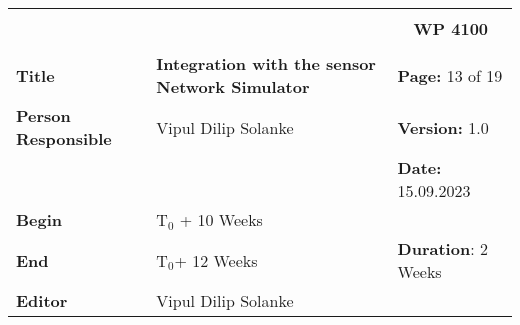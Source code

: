 \begin{table}[!h]
  \begin{center}
    \begin{tabular}{|p{35mm}||p{55mm}|p{50mm}||p{40mm}|}
      \hline
      \multicolumn{3}{|l||}{\textbf{}} & \multicolumn{1}{c|}{}                                                                                                                                                \\
      \multicolumn{3}{|l||}{\textbf{}} & \multicolumn{1}{c|}{\textbf{WP 4100}}                                                                                                                                \\
      \multicolumn{3}{|l||}{\textbf{}} & \multicolumn{1}{c|}{}                                                                                                                                                \\
      \hline\hline
      \textbf{Title}                   & \multicolumn{2}{p{7cm}||}{\textbf{Integration with the sensor Network Simulator}}
                                       & \textbf{Page:} 13 of 19                                                                                                                                             \\
      \hline
      \textbf{Person Responsible}        & \multicolumn{2}{l||}{Vipul Dilip Solanke}                                                                                                   & \textbf{Version:} 1.0   \\
      \hline
      \multicolumn{3}{|l||}{}          & \textbf{Date:} 15.09.2023                                                                                                                                          \\
      \hline\hline
      \textbf{Begin}                  & \multicolumn{2}{l||}{T$_0$ + 10 Weeks}                                                                                                                &                         \\
      \hline
      \textbf{End}                    & \multicolumn{2}{l||}{T$_0$+ 12 Weeks}                                                                                                        & \textbf{Duration}: 2 Weeks \\
      \hline\hline
      \textbf{Editor}              & \multicolumn{3}{l|}{Vipul Dilip Solanke}                                                                                                                              \\

\end{tabular}
\end{center}
\end{table}
